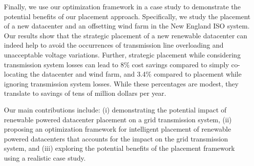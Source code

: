 Finally, we use our optimization framework in a case study to
demonstrate the potential benefits of our placement approach.
Specifically, we study the placement of a new datacenter and an
offsetting wind farm in the New England ISO system.  Our results show
that the strategic placement of a new renewable datacenter can indeed
help to avoid the occurrences of transmission line overloading and
unacceptable voltage variations.  Further, strategic placement while
considering transmission system losses can lead to 8\% cost savings
compared to simply co-locating the datacenter and wind farm, and 3.4\%
compared to placement while ignoring transmission system losses.
While these percentages are modest, they translate to savings of tens
of million dollars per year.


 Our main contributions include: (i) demonstrating the potential impact of renewable powered datacenter placement on a grid transmission system, (ii) proposing an optimization framework for intelligent placement of renewable powered datacenters that accounts for the impact on the grid transmission system, and (iii) exploring the potential benefits of the placement framework using a realistic case study.

